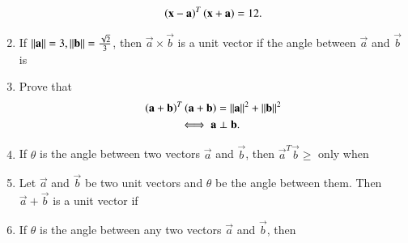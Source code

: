 \begin{enumerate}[label=\arabic*.,ref=\thesubsection.\theenumi]
\begin{align}
\left(\mathbf{x}-\mathbf{a}\right)^T\left(\mathbf{x}+\mathbf{a}\right) = 12.
\end{align}
\item If $\left\lVert\mathbf{a}\right\rVert = 3, \left\lVert\mathbf{b}\right\rVert =\frac{\sqrt{2}}{3}$, then $\vec{a}\times \vec{b}$ is a unit vector if the angle between $\vec{a}$ and $\vec{b}$ is 
\begin{enumerate}[itemsep = 2pt]
\end{enumerate}
\item Prove that 
\begin{align}
\left(\mathbf{a}+\mathbf{b}\right)^T\left(\mathbf{a}+\mathbf{b}\right) &= \left\lVert\mathbf{a}\right\rVert^2+\left\lVert\mathbf{b}\right\rVert^2
\\
\iff \mathbf{a}&\perp\mathbf{b}.
\end{align}
\item If $\theta$ is the angle between two vectors $\vec{a}$ and $\vec{b}$, then $\vec{a}^T\vec{b} \ge $ only when 
\begin{enumerate}[itemsep = 2pt]
\end{enumerate}
\item Let $\vec{a}$ and $\vec{b}$ be two unit vectors and $\theta$ be the angle between them.  Then $\vec{a}+\vec{b}$ is a unit vector if 
\begin{enumerate}[itemsep = 2pt]
\end{enumerate}
\item If $\theta$ is the angle between any two vectors $\vec{a}$ and $\vec{b}$, then 

\end{enumerate}
